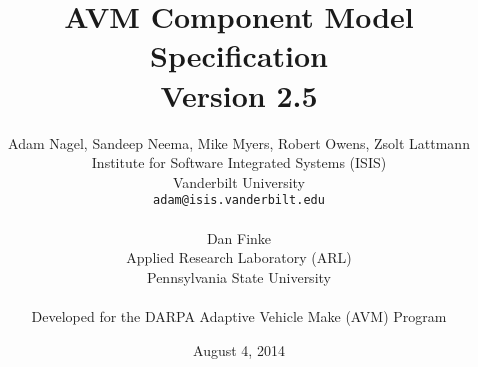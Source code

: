 \documentclass{report}
\title{AVM Component Model Specification\\Version 2.5}
\author{Adam Nagel, Sandeep Neema, Mike Myers, Robert Owens, Zsolt Lattmann\\
	Institute for Software Integrated Systems (ISIS)\\
	Vanderbilt University\\
	\texttt{adam@isis.vanderbilt.edu}\\
	\\
	Dan Finke\\
	Applied Research Laboratory (ARL)\\
	Pennsylvania State University\\
	\\
	Developed for the DARPA Adaptive Vehicle Make (AVM) Program}
\date{August 4, 2014}
\begin{document}
\maketitle

\def\chapterautorefname{Chapter}
\def\subsubsectionautorefname{Section}
\def\subsectionautorefname{Section}
\def\sectionautorefname{Section}

\newpage
\tableofcontents
\cleardoublepage
\listoffigures

\newpage
























\end{document}
